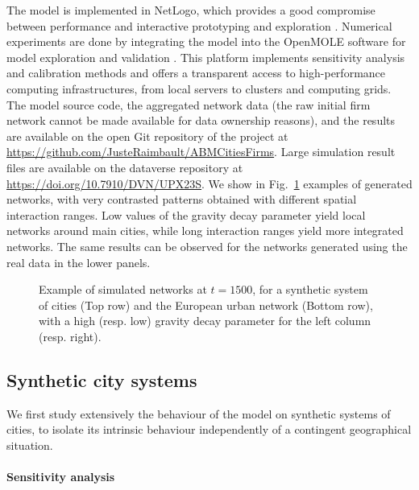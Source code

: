 \documentclass[10pt,letterpaper]{article}
\begin{document}
The model is implemented in NetLogo, which provides a good compromise between performance and interactive prototyping and exploration \cite{railsback2017improving}. Numerical experiments are done by integrating the model into the OpenMOLE software for model exploration and validation \cite{reuillon2013openmole}. This platform implements sensitivity analysis and calibration methods and offers a transparent access to high-performance computing infrastructures, from local servers to clusters and computing grids. The model source code, the aggregated network data (the raw initial firm network cannot be made available for data ownership reasons), and the results are available on the open Git repository of the project at \url{https://github.com/JusteRaimbault/ABMCitiesFirms}. Large simulation result files are available on the dataverse repository at \url{https://doi.org/10.7910/DVN/UPX23S}. We show in Fig.~\ref{fig:fig3} examples of generated networks, with very contrasted patterns obtained with different spatial interaction ranges. Low values of the gravity decay parameter yield local networks around main cities, while long interaction ranges yield more integrated networks. The same results can be observed for the networks generated using the real data in the lower panels.


\begin{figure}
    \begin{center}
    \end{center}
    \caption{Example of simulated networks at $t=1500$, for a synthetic system of cities (Top row) and the European urban network (Bottom row), with a high (resp. low) gravity decay parameter for the left column (resp. right).\label{fig:fig3}}
\end{figure}


\subsection*{Synthetic city systems}

We first study extensively the behaviour of the model on synthetic systems of cities, to isolate its intrinsic behaviour independently of a contingent geographical situation.

\paragraph{Sensitivity analysis}
\end{document}
